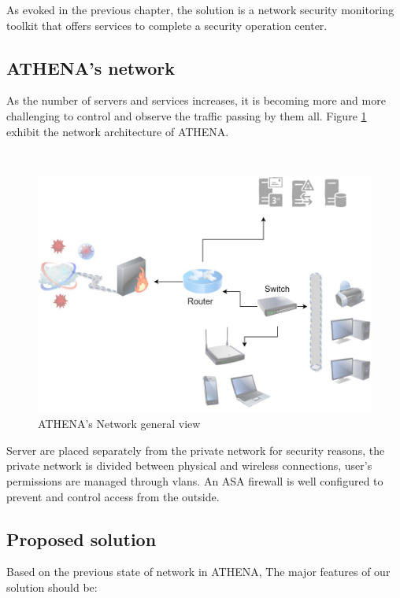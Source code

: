 As evoked in the previous chapter, the solution is a network security monitoring toolkit that offers services to complete a security operation center.

\subsection{ATHENA's network}

As the number of servers and services increases, it is becoming more and more challenging to control and observe the traffic passing by them all. Figure \ref{networkarch} exhibit the network architecture of ATHENA. 

~

\begin{figure}[!htpb]
\begin{center}
\includegraphics[height=3.5 in]{images/ATHENAnetw.jpg}
\caption{ATHENA's Network general view}
\label{networkarch}
\end{center}
\end{figure} 

Server are placed separately from the private network for security reasons, the private network is divided between physical and wireless connections, user's permissions are managed through vlans. An ASA firewall is well configured to prevent and control access from the outside.
\subsection{Proposed solution}

Based on the previous state of network in ATHENA, The major features of our solution should be:

